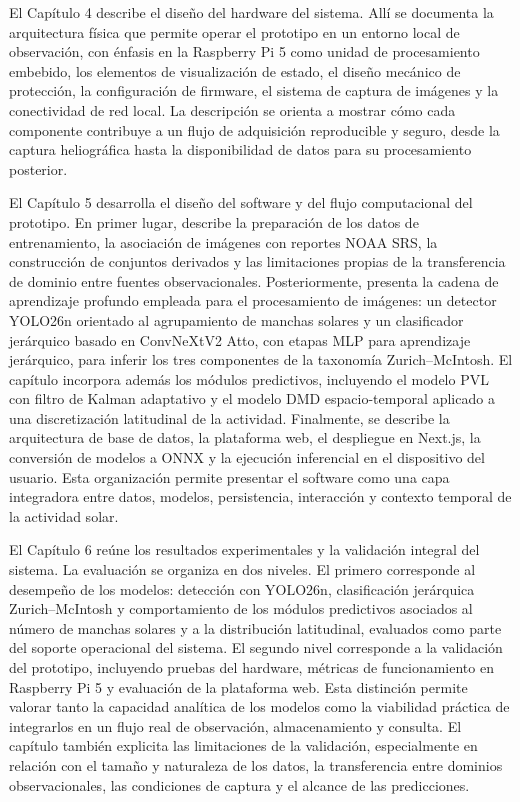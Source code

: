 El Capítulo 4 describe el diseño del hardware del sistema. Allí se documenta la arquitectura física que permite operar el prototipo en un entorno local de observación, con énfasis en la Raspberry Pi 5 como unidad de procesamiento embebido, los elementos de visualización de estado, el diseño mecánico de protección, la configuración de firmware, el sistema de captura de imágenes y la conectividad de red local. La descripción se orienta a mostrar cómo cada componente contribuye a un flujo de adquisición reproducible y seguro, desde la captura heliográfica hasta la disponibilidad de datos para su procesamiento posterior.

El Capítulo 5 desarrolla el diseño del software y del flujo computacional del prototipo. En primer lugar, describe la preparación de los datos de entrenamiento, la asociación de imágenes con reportes NOAA SRS, la construcción de conjuntos derivados y las limitaciones propias de la transferencia de dominio entre fuentes observacionales. Posteriormente, presenta la cadena de aprendizaje profundo empleada para el procesamiento de imágenes: un detector YOLO26n orientado al agrupamiento de manchas solares y un clasificador jerárquico basado en ConvNeXtV2 Atto, con etapas MLP para aprendizaje jerárquico, para inferir los tres componentes de la taxonomía Zurich--McIntosh. El capítulo incorpora además los módulos predictivos, incluyendo el modelo PVL con filtro de Kalman adaptativo y el modelo DMD espacio-temporal aplicado a una discretización latitudinal de la actividad. Finalmente, se describe la arquitectura de base de datos, la plataforma web, el despliegue en Next.js, la conversión de modelos a ONNX y la ejecución inferencial en el dispositivo del usuario. Esta organización permite presentar el software como una capa integradora entre datos, modelos, persistencia, interacción y contexto temporal de la actividad solar.

El Capítulo 6 reúne los resultados experimentales y la validación integral del sistema. La evaluación se organiza en dos niveles. El primero corresponde al desempeño de los modelos: detección con YOLO26n, clasificación jerárquica Zurich--McIntosh y comportamiento de los módulos predictivos asociados al número de manchas solares y a la distribución latitudinal, evaluados como parte del soporte operacional del sistema. El segundo nivel corresponde a la validación del prototipo, incluyendo pruebas del hardware, métricas de funcionamiento en Raspberry Pi 5 y evaluación de la plataforma web. Esta distinción permite valorar tanto la capacidad analítica de los modelos como la viabilidad práctica de integrarlos en un flujo real de observación, almacenamiento y consulta. El capítulo también explicita las limitaciones de la validación, especialmente en relación con el tamaño y naturaleza de los datos, la transferencia entre dominios observacionales, las condiciones de captura y el alcance de las predicciones.

